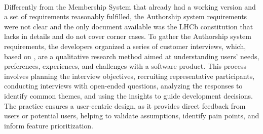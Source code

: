 \paragraph{} Differently from the Membership System that already had a working version and a set of requirements reasonably fulfilled, the Authorship system requirements were not clear and the only document available was the LHCb constitution \cite{LHCbConstitution} that lacks in details and do not cover corner cases. To gather the Authorship system requirements, the developers organized a series of customer interviews, which, based on \cite{CustomerInterview}, are a qualitative research method aimed at understanding users' needs, preferences, experiences, and challenges with a software product. This process involves planning the interview objectives, recruiting representative participants, conducting interviews with open-ended questions, analyzing the responses to identify common themes, and using the insights to guide development decisions. The practice ensures a user-centric design, as it provides direct feedback from users or potential users, helping to validate assumptions, identify pain points, and inform feature prioritization. 

